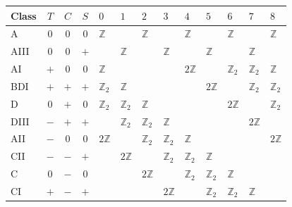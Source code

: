\begin{table}
    \centering
    \addtolength{\tabcolsep}{0.25cm}
    \renewcommand{\arraystretch}{1.25} %
    \begin{tabular}{l | c c c | l l l l l l l l l}
        \hline\hline
        Class   & $T$ & $C$ & $S$ & $0$ & $1$ & $2$ & $3$ & $4$ & $5$ & $6$ & $7$ & $8$\\
        \hline
        A       & $0$ & $0$ & $0$ & $\mathds Z$   &               & $\mathds Z$   &               & $\mathds Z$   &               & $\mathds Z$   &               & $\mathds Z$   \\
        AIII    & $0$ & $0$ & $+$ &               & $\mathds Z$   &               & $\mathds Z$   &               & $\mathds Z$   &               & $\mathds Z$   &               \\
        \hline
        AI      & $+$ & $0$ & $0$ & $\mathds Z$   &               &               &               & $2\mathds Z$  &               & $\mathds Z_2$ & $\mathds Z_2$ & $\mathds Z$   \\
        BDI     & $+$ & $+$ & $+$ & $\mathds Z_2$ & $\mathds Z$   &               &               &               & $2\mathds Z$  &               & $\mathds Z_2$ & $\mathds Z_2$ \\
        D       & $0$ & $+$ & $0$ & $\mathds Z_2$ & $\mathds Z_2$ & $\mathds Z$   &               &               &               & $2\mathds Z$  &               & $\mathds Z_2$ \\
        DIII    & $-$ & $+$ & $+$ &               & $\mathds Z_2$ & $\mathds Z_2$ & $\mathds Z$   &               &               &               & $2\mathds Z$  &               \\
        AII     & $-$ & $0$ & $0$ & $2\mathds Z$  &               & $\mathds Z_2$ & $\mathds Z_2$ & $\mathds Z$   &               &               &               & $2\mathds Z$  \\
        CII     & $-$ & $-$ & $+$ &               & $2\mathds Z$  &               & $\mathds Z_2$ & $\mathds Z_2$ & $\mathds Z$   &               &               &               \\
        C       & $0$ & $-$ & $0$ &               &               & $2\mathds Z$  &               & $\mathds Z_2$ & $\mathds Z_2$ & $\mathds Z$   &               &               \\
        CI      & $+$ & $-$ & $+$ &               &               &               & $2\mathds Z$  &               & $\mathds Z_2$ & $\mathds Z_2$ & $\mathds Z$   &               \\

\end{tabular}
\end{table}

